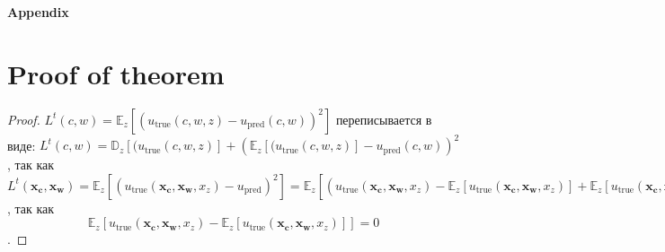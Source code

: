 \documentclass{article}
\begin{document}
\newpage
\begin{center}
    \LARGE \textbf{Appendix}
\end{center}
\normalsize

\appendix

        \section{Proof of theorem}
    \begin{proof}

        $L^t(c, w) = \mathbb{E}_z[(u_{\text{true}}(c, w, z) - u_{\text{pred}}(c, w))^2]$ переписывается в виде:
        $L^t(c, w) = \mathbb{D}_z[(u_{\text{true}}(c, w, z)] + \left(\mathbb{E}_z[(u_{\text{true}}(c, w, z)] - u_{\text{pred}}(c, w)\right)^2$, так как
        $L^t(\mathbf{x_c}, \mathbf{x_w}) = \mathbb{E}_z \left[(u_{\text{true}}(\mathbf{x_c}, \mathbf{x_w}, x_z)-u_{\text{pred}})^2 \right] = \mathbb{E}_z \left[(u_{\text{true}}(\mathbf{x_c}, \mathbf{x_w}, x_z) -  \mathbb{E}_z \left[  u_{\text{true}}(\mathbf{x_c}, \mathbf{x_w}, x_z) \right] + \mathbb{E}_z \left[ u_{\text{true}}(\mathbf{x_c}, \mathbf{x_w}, x_z) \right] - u_{\text{pred}}(\mathbf{x_c}, \mathbf{x_w}))^2 \right] = \mathbb{E}_z \left[(u_{\text{true}}(\mathbf{x_c}, \mathbf{x_w}, x_z) -  \mathbb{E}_z \left[  u_{\text{true}}(\mathbf{x_c}, \mathbf{x_w}, x_z) \right])^2\right] + \mathbb{E}_z \left[( \mathbb{E}_z \left[  u_{\text{true}}(\mathbf{x_c}, \mathbf{x_w}, x_z) \right] -  u_{\text{pred}}(\mathbf{x_c}, \mathbf{x_w}))^2\right]  + 2\mathbb{E}_z \left[u_{\text{true}}(\mathbf{x_c}, \mathbf{x_w}, x_z) -  \mathbb{E}_z \left[  u_{\text{true}}(\mathbf{x_c}, \mathbf{x_w}, x_z) \right]\right] \cdot  (\mathbb{E}_z \left[ u_{\text{true}}(\mathbf{x_c}, \mathbf{x_w}, x_z) \right] - u_{\text{pred}}(\mathbf{x_c}, \mathbf{x_w})) = \mathbb{D}_z \left[ u_{\text{true}}\right] + ( \mathbb{E}_z \left[  u_{\text{true}}(\mathbf{x_c}, \mathbf{x_w}, x_z) \right] -  u_{\text{pred}}(\mathbf{x_c}, \mathbf{x_w}))^2 $, так как $$\mathbb{E}_z \left[u_{\text{true}}(\mathbf{x_c}, \mathbf{x_w}, x_z) -  \mathbb{E}_z \left[  u_{\text{true}}(\mathbf{x_c}, \mathbf{x_w}, x_z) \right]\right] = 0$$.

    \end{proof}
\end{document}
